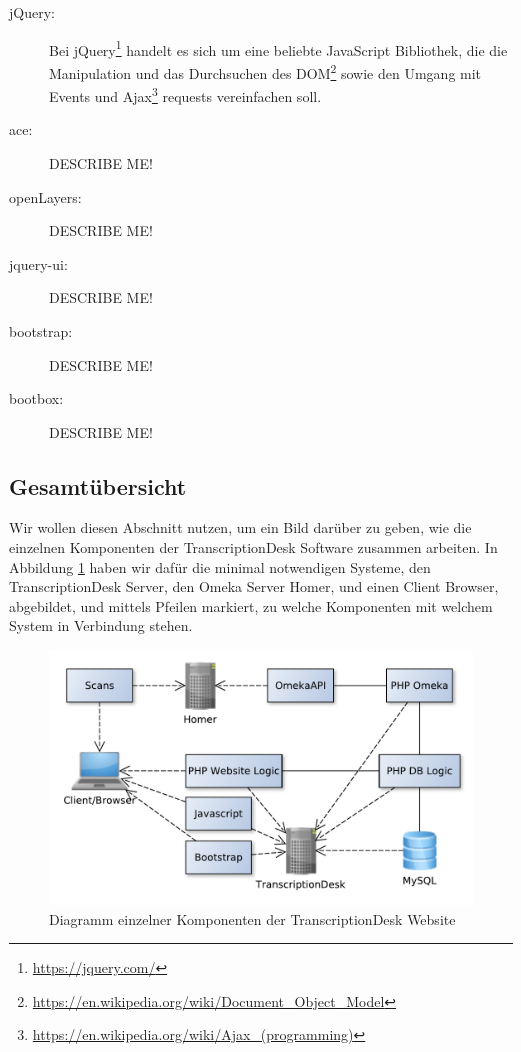 \documentclass{article}
\begin{document}
\begin{description}
\item[jQuery:]
    Bei jQuery\footnote{\url{https://jquery.com/}} handelt es sich um eine beliebte JavaScript Bibliothek,
    die die Manipulation und das Durchsuchen des DOM\footnote{\url{https://en.wikipedia.org/wiki/Document_Object_Model}} sowie
    den Umgang mit Events und Ajax\footnote{\url{https://en.wikipedia.org/wiki/Ajax_(programming)}} requests vereinfachen soll.
\item[ace:]
    DESCRIBE ME!
\item[openLayers:]
    DESCRIBE ME!
\item[jquery-ui:]
    DESCRIBE ME!
\item[bootstrap:]
    DESCRIBE ME!
\item[bootbox:]
    DESCRIBE ME!
\end{description}

\subsection{Gesamtübersicht}
Wir wollen diesen Abschnitt nutzen, um ein Bild darüber zu geben,
wie die einzelnen Komponenten der TranscriptionDesk Software zusammen arbeiten.
In Abbildung \ref{fig:components} haben wir dafür die minimal notwendigen Systeme,
den TranscriptionDesk Server, den Omeka Server Homer, und einen Client Browser, abgebildet,
und mittels Pfeilen markiert, zu welche Komponenten mit welchem System in Verbindung stehen.
\\\begin{figure}[H]
\includegraphics[width=\textwidth]{../notes/components.pdf}
\caption{Diagramm einzelner Komponenten der TranscriptionDesk Website}
\label{fig:components}
\end{figure}
\end{document}
